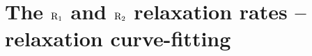 


\chapter[Relaxation curve-fitting]{The $\mathrm{R}_1$ and $\mathrm{R}_2$ relaxation rates -- relaxation curve-fitting} \label{ch: relax-fit}


